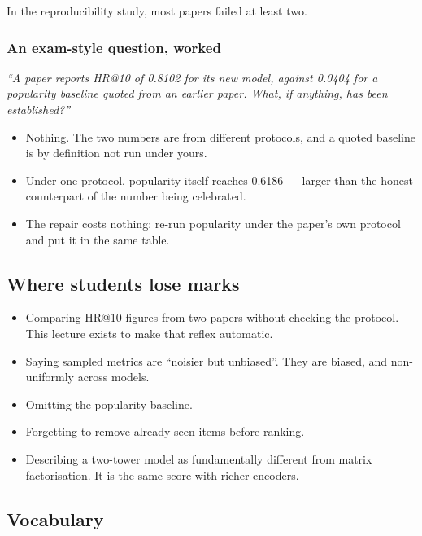 \documentclass[11pt,a4paper]{article}
\begin{document}
In the reproducibility study, most papers failed at least two.

\subsubsection{An exam-style question, worked}

\emph{``A paper reports HR@10 of 0.8102 for its new model, against 0.0404 for a
popularity baseline quoted from an earlier paper. What, if anything, has been
established?''}

\begin{itemize}[leftmargin=*,nosep]
  \item Nothing. The two numbers are from different protocols, and a quoted
        baseline is by definition not run under yours.
  \item Under one protocol, popularity itself reaches 0.6186 --- larger than
        the honest counterpart of the number being celebrated.
  \item The repair costs nothing: re-run popularity under the paper's own
        protocol and put it in the same table.
\end{itemize}

\subsection{Where students lose marks}

\begin{itemize}[leftmargin=*,nosep]
  \item Comparing HR@10 figures from two papers without checking the protocol.
        This lecture exists to make that reflex automatic.
  \item Saying sampled metrics are ``noisier but unbiased''. They are biased,
        and non-uniformly across models.
  \item Omitting the popularity baseline.
  \item Forgetting to remove already-seen items before ranking.
  \item Describing a two-tower model as fundamentally different from matrix
        factorisation. It is the same score with richer encoders.
\end{itemize}

\subsection{Vocabulary}
\end{document}
